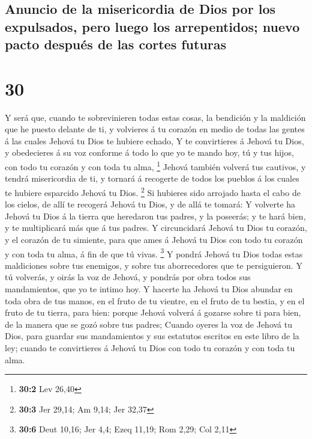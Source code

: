 \hypertarget{anuncio-de-la-misericordia-de-dios-por-los-expulsados-pero-luego-los-arrepentidos-nuevo-pacto-despuuxe9s-de-las-cortes-futuras}{%
\subsection{Anuncio de la misericordia de Dios por los expulsados, pero
luego los arrepentidos; nuevo pacto después de las cortes
futuras}\label{anuncio-de-la-misericordia-de-dios-por-los-expulsados-pero-luego-los-arrepentidos-nuevo-pacto-despuuxe9s-de-las-cortes-futuras}}

\hypertarget{section-29}{%
\section{30}\label{section-29}}

 Y será que, cuando te sobrevinieren todas estas cosas, la
bendición y la maldición que he puesto delante de ti, y volvieres á tu
corazón en medio de todas las gentes á las cuales Jehová tu Dios te
hubiere echado,  Y te convirtieres á Jehová tu Dios, y
obedecieres á su voz conforme á todo lo que yo te mando hoy, tú y tus
hijos, con todo tu corazón y con toda tu alma, \footnote{\textbf{30:2}
  Lev 26,40}  Jehová también volverá tus cautivos, y
tendrá misericordia de ti, y tornará á recogerte de todos los pueblos á
los cuales te hubiere esparcido Jehová tu Dios. \footnote{\textbf{30:3}
  Jer 29,14; Am 9,14; Jer 32,37}  Si hubieres sido
arrojado hasta el cabo de los cielos, de allí te recogerá Jehová tu
Dios, y de allá te tomará:  Y volverte ha Jehová tu Dios á
la tierra que heredaron tus padres, y la poseerás; y te hará bien, y te
multiplicará más que á tus padres.  Y circuncidará Jehová
tu Dios tu corazón, y el corazón de tu simiente, para que ames á Jehová
tu Dios con todo tu corazón y con toda tu alma, á fin de que tú vivas.
\footnote{\textbf{30:6} Deut 10,16; Jer 4,4; Ezeq 11,19; Rom 2,29; Col
  2,11}  Y pondrá Jehová tu Dios todas estas maldiciones
sobre tus enemigos, y sobre tus aborrecedores que te persiguieron.
 Y tú volverás, y oirás la voz de Jehová, y pondrás por
obra todos sus mandamientos, que yo te intimo hoy.  Y
hacerte ha Jehová tu Dios abundar en toda obra de tus manos, en el fruto
de tu vientre, en el fruto de tu bestia, y en el fruto de tu tierra,
para bien: porque Jehová volverá á gozarse sobre ti para bien, de la
manera que se gozó sobre tus padres;  Cuando oyeres la
voz de Jehová tu Dios, para guardar sus mandamientos y sus estatutos
escritos en este libro de la ley; cuando te convirtieres á Jehová tu
Dios con todo tu corazón y con toda tu alma.

